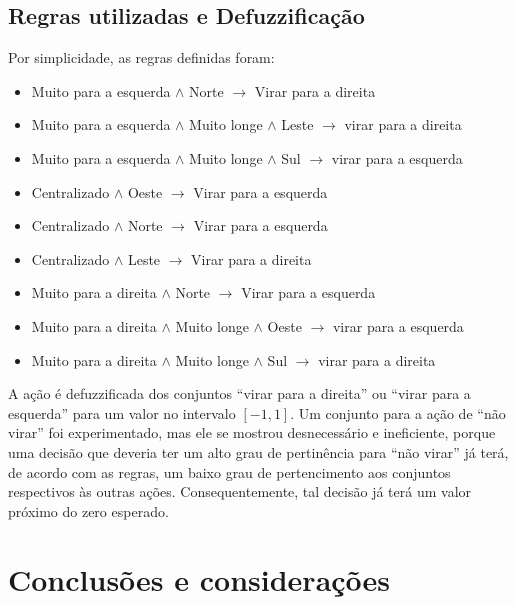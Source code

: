 \documentclass[twocolumn]{article}
\begin{document}
    \subsection{Regras utilizadas e Defuzzificação}

    Por simplicidade, as regras definidas foram:

    \begin{itemize}
        \item Muito para a esquerda $\land$ Norte $\rightarrow$ Virar para a
            direita
        \item Muito para a esquerda $\land$ Muito longe $\land$ Leste
            $\rightarrow$ virar para a direita
        \item Muito para a esquerda $\land$ Muito longe $\land$ Sul
            $\rightarrow$ virar para a esquerda
        \item Centralizado $\land$ Oeste $\rightarrow$ Virar para a esquerda
        \item Centralizado $\land$ Norte $\rightarrow$ Virar para a esquerda
        \item Centralizado $\land$ Leste $\rightarrow$ Virar para a direita
        \item Muito para a direita $\land$ Norte $\rightarrow$ Virar para a
            esquerda
        \item Muito para a direita $\land$ Muito longe $\land$ Oeste
            $\rightarrow$ virar para a esquerda
        \item Muito para a direita $\land$ Muito longe $\land$ Sul
            $\rightarrow$ virar para a direita
    \end{itemize}

    A ação é defuzzificada dos conjuntos ``virar para a direita'' ou ``virar
    para a esquerda'' para um valor no intervalo $[-1, 1]$. Um conjunto para a
    ação de ``não virar'' foi experimentado, mas ele se mostrou desnecessário e
    ineficiente, porque uma decisão que deveria ter um alto grau de pertinência
    para ``não virar'' já terá, de acordo com as regras, um baixo grau de
    pertencimento aos conjuntos respectivos às outras ações. Consequentemente,
    tal decisão já terá um valor próximo do zero esperado.

    \section{Conclusões e considerações}
\end{document}
